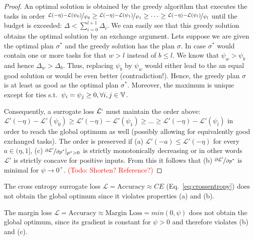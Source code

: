 \documentclass[sigconf,authordraft]{acmart}
\newcommand{\todo}[1]{\textcolor{red}{(Todo: #1)}}
\begin{document}
\begin{proof}
  An optimal solution is obtained by the greedy algorithm that executes the tasks in order \(\nicefrac{\mathcal{L}(-\eta) - \mathcal{L}(\psi_0)}{\psi_0} \ge \nicefrac{\mathcal{L}(-\eta) - \mathcal{L}(\psi_1)}{\psi_1} \ge \dots \ge \nicefrac{\mathcal{L}(-\eta) - \mathcal{L}(\psi_l)}{\psi_l}\) until the budget is exceeded: \(\Delta < \sum_{i=0}^{l+1} \Delta_i\). We can easily see that this greedy solution obtains the optimal solution by an exchange argument. Lets suppose we are given the optimal plan \(\sigma^*\) and the greedy solution has the plan \(\sigma\). In case \(\sigma^*\) would contain one or more tasks for that \(w > l\) instead of \(b \le l\). We know that \(\psi_w > \psi_b\) and hence \(\Delta_w > \Delta_b\). Thus, replacing \(\psi_b\) by \(\psi_w\) would either lead to the an equal good solution or would be even better (contradiction!). Hence, the greedy plan \(\sigma\) is at least as good as the optimal plan \(\sigma^*\). Moreover, the maximum is unique except for ties s.t.\ \(\psi_i = \psi_j \ge 0, \forall i, j \in {\mathbb{V}}\).

  Consequently, a surrogate loss \(\mathcal{L}`\) must maintain the order above: \(\mathcal{L}'(-\eta) - \mathcal{L}'(\psi_0) \ge \mathcal{L}'(-\eta) - \mathcal{L}'(\psi_1) \ge \dots \ge \mathcal{L}'(-\eta) - \mathcal{L}'(\psi_l)\) in order to reach the global optimum as well (possibly allowing for equivalently good exchanged tasks). The order is preserved if (a) \(\mathcal{L}'(-a) \le \mathcal{L}'(-\eta)\) for every \(a \in (\eta,1]\), (c) \(\nicefrac{\partial \mathcal{L}'}{\partial p^*}|_{p^* > 0}\) is strictly monotonically decreasing or in other words \(\mathcal{L}'\) is strictly concave for positive inputs. From this it follows that (b) \(\nicefrac{\partial \mathcal{L}'}{\partial p^*}\) is minimal for \(\psi \to 0^+\). \todo{Shorten? Reference?}
\end{proof}

\begin{corollary}\label{corollary:ce}
  The cross entropy surrogate loss \(\mathcal{L} = \text{Accuracy} \approx CE\) (Eq.~\ref{eq:crossentropy}) does not obtain the global optimum since it violates properties (a) and (b).
\end{corollary}

\begin{corollary}\label{corollary:margin}
  The margin loss \(\mathcal{L} = \text{Accuracy} \approx \text{Margin Loss} = min(0, \psi)\) does not obtain the global optimum, since its gradient is constant for \(\psi > 0\) and therefore violates (b) and (c).
\end{corollary}
\end{document}

